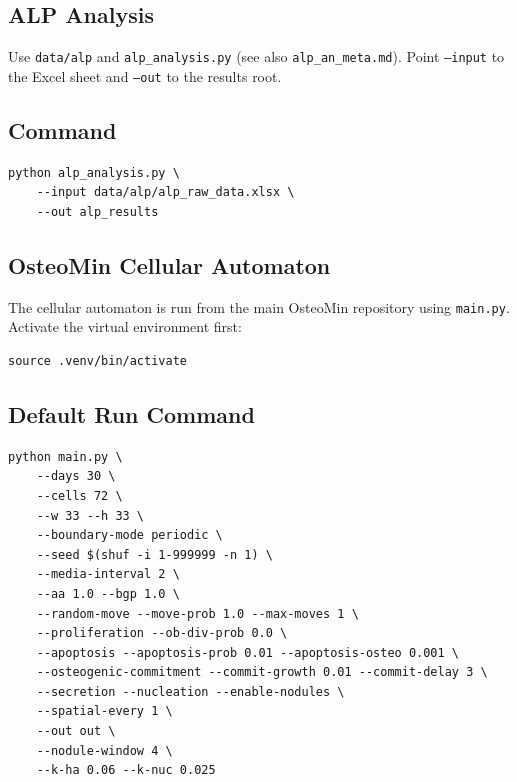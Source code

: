 \documentclass[11pt,a4paper]{article}
\begin{document}

\subsection{ALP Analysis}

Use \texttt{data/alp} and \texttt{alp\_analysis.py}  
(see also \texttt{alp\_an\_meta.md}).  
Point \texttt{--input} to the Excel sheet and \texttt{--out} to the results root.

\subsection*{Command}

\begin{center}
\begin{minipage}{0.9\linewidth}
\begin{verbatim}
python alp_analysis.py \
    --input data/alp/alp_raw_data.xlsx \
    --out alp_results
\end{verbatim}
\end{minipage}
\end{center}



\subsection{OsteoMin Cellular Automaton}

The cellular automaton is run from the main OsteoMin repository using
\texttt{main.py}.  
Activate the virtual environment first:

\begin{center}
\begin{minipage}{0.9\linewidth}
\begin{verbatim}
source .venv/bin/activate
\end{verbatim}
\end{minipage}
\end{center}

\subsection*{Default Run Command}

\begin{center}
\begin{minipage}{0.95\linewidth}
\begin{verbatim}
python main.py \
    --days 30 \
    --cells 72 \
    --w 33 --h 33 \
    --boundary-mode periodic \
    --seed $(shuf -i 1-999999 -n 1) \
    --media-interval 2 \
    --aa 1.0 --bgp 1.0 \
    --random-move --move-prob 1.0 --max-moves 1 \
    --proliferation --ob-div-prob 0.0 \
    --apoptosis --apoptosis-prob 0.01 --apoptosis-osteo 0.001 \
    --osteogenic-commitment --commit-growth 0.01 --commit-delay 3 \
    --secretion --nucleation --enable-nodules \
    --spatial-every 1 \
    --out out \
    --nodule-window 4 \
    --k-ha 0.06 --k-nuc 0.025
\end{verbatim}
\end{minipage}
\end{center}
\end{document}
